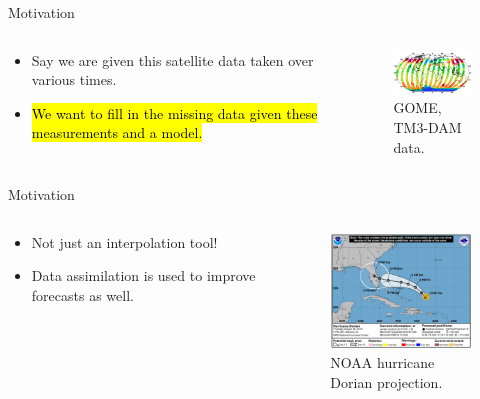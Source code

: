 \documentclass[aspectratio=169]{beamer}
\makeatletter
\let\HL\hl
\renewcommand\hl{%
  \let\set@color\beamerorig@set@color
  \let\reset@color\beamerorig@reset@color
  \HL}
\makeatother
\begin{document}
\begin{frame}{Motivation}
    \vfill
    \begin{columns}
    \begin{column}{.49\textwidth}
    \begin{itemize}
        \item Say we are given this satellite data taken over various times.
        \item \hl{We want to fill in the missing data given these measurements and a model.}
    \end{itemize}
    \end{column}

 \begin{column}{.49\textwidth}
        \begin{figure}[h]
            \centering
            \vspace*{3.5mm}
            \includegraphics[width=40mm]{figures/gome_data.png}
            \caption{GOME, TM3-DAM data.}
        \end{figure}
 \end{column}
\end{columns}
\vfill
\end{frame}


\begin{frame}{Motivation}
\vfill
    \begin{columns}
    \begin{column}{.49\textwidth}
    \begin{itemize}
        \item Not just an interpolation tool!
        \item Data assimilation is used to improve forecasts as well.
    \end{itemize}
    \end{column}

 \begin{column}{.49\textwidth}
        \begin{figure}[h]
            \centering
            \vspace*{3.5mm}
            \includegraphics[width=40mm]{figures/hurricane_prediction.png}
            \caption{NOAA hurricane Dorian projection.}
        \end{figure}
 \end{column}
\end{columns}
\vfill 
\end{frame}
\end{document}
